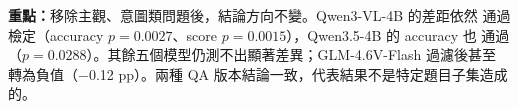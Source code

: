 \documentclass[a4paper,11pt]{article}
\begin{document}
\medskip
\begin{table}[!htbp]
  \centering
  \caption{Per-video outcome for
    Table~\ref{tab:vdc-resolution-factual-results}
    (accuracy, out of 214 videos).}
  \label{tab:vdc-resolution-factual-pervideo}
\end{table}

\noindent
\textbf{重點：}移除主觀、意圖類問題後，結論方向不變。Qwen3-VL-4B 的差距依然
通過檢定（accuracy $p=0.0027$、score $p=0.0015$），Qwen3.5-4B 的 accuracy 也
通過（$p=0.0288$）。其餘五個模型仍測不出顯著差異；GLM-4.6V-Flash 過濾後甚至
轉為負值（$-$0.12 pp）。兩種 QA 版本結論一致，代表結果不是特定題目子集造成的。
\end{document}
